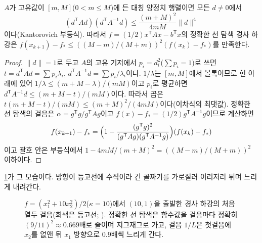 \begin{proposition}
\label{prop:kantorovich}
$A$가 고유값이 $[m,M]$($0<m\le M$)에 든 대칭 양정치 행렬이면 모든 $d\ne0$에서
\[
(d^{\mathsf T}Ad)(d^{\mathsf T}A^{-1}d)\le\frac{(m+M)^2}{4mM}\|d\|^4
\]
이다(Kantorovich 부등식). 따라서 $f=(1/2)x^{\mathsf T}Ax-b^{\mathsf T}x$의 정확한 선 탐색 경사 하강은 $f(x_{k+1})-f_\ast\le((M-m)/(M+m))^2(f(x_k)-f_\ast)$를 만족한다.
\end{proposition}

\begin{proof}
$\|d\|=1$로 두고 $A$의 고유 기저에서 $p_i=d_i^2$($\sum p_i=1$)로 쓰면 $t=d^{\mathsf T}Ad=\sum p_i\lambda_i$, $d^{\mathsf T}A^{-1}d=\sum p_i/\lambda_i$이다. $1/\lambda$는 $[m,M]$에서 볼록이므로 현 아래에 있어 $1/\lambda\le(m+M-\lambda)/(mM)$이고 $p_i$로 평균하면 $d^{\mathsf T}A^{-1}d\le(m+M-t)/(mM)$이다. 따라서 곱은 $t(m+M-t)/(mM)\le(m+M)^2/(4mM)$이다(이차식의 최댓값). 정확한 선 탐색의 걸음은 $\alpha=g^{\mathsf T}g/g^{\mathsf T}Ag$이고 $f(x)-f_\ast=(1/2)g^{\mathsf T}A^{-1}g$이므로 계산하면
\[
f(x_{k+1})-f_\ast=\Bigl(1-\frac{(g^{\mathsf T}g)^2}{(g^{\mathsf T}Ag)(g^{\mathsf T}A^{-1}g)}\Bigr)(f(x_k)-f_\ast)
\]
이고 괄호 안은 부등식에서 $1-4mM/(m+M)^2=((M-m)/(M+m))^2$ 이하이다.
\end{proof}

\cref{fig:zigzag}가 그 모습이다. 방향이 등고선에 수직이라 긴 골짜기를 가로질러 이리저리 튀며 느리게 내려간다.

\begin{figure}[htbp]
\centering
{}
\caption{$f=(x_1^2+10x_2^2)/2$($\kappa=10$)에서 $(10,1)$을 출발한 경사 하강의 처음 열두 걸음(회색은 등고선; ). 정확한 선 탐색은 함수값을 걸음마다 정확히 $(9/11)^2\approx0.669$배로 줄이며 지그재그로 가고, 걸음 $1/L$은 첫걸음에 $x_2$를 없앤 뒤 $x_1$ 방향으로 $0.9$배씩 느리게 간다.}
\label{fig:zigzag}
\end{figure}

